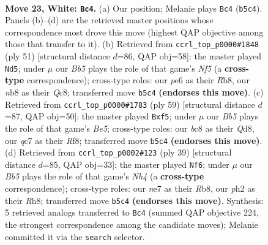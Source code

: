 \documentclass[11pt]{article}
\begin{document}
\clearpage

\begin{figure}[p]\centering
\begin{subfigure}{0.46\textwidth}\centering
\resizebox{\linewidth}{!}{%
\newchessgame
\chessboard[
  setfen={1nb2kr1/2q1n3/4p3/rBP1Pp2/p4N2/P3B3/2P2KPp/RQ5R w - - 1 23},
  showmover=false,
  pgfstyle=straightmove, color=movearrow, markmove={b5-c4}
]}
\caption{}
\end{subfigure}\hfill
\begin{subfigure}{0.46\textwidth}\centering
\resizebox{\linewidth}{!}{%
\newchessgame
\chessboard[
  setfen={1rq1r1k1/p4pp1/7p/2b5/P2N1n2/2P1p3/1P4PP/3RRQBK b - - 1 26},
  showmover=false,
  pgfstyle=straightmove, color=movearrow, markmove={f4-d5}
]}
\caption{}
\end{subfigure}
\\[4pt]
\begin{subfigure}{0.46\textwidth}\centering
\resizebox{\linewidth}{!}{%
\newchessgame
\chessboard[
  setfen={3q1rk1/r3b1p1/3p3p/p2P1P2/P1N1bB2/1P2R2P/3Q3K/5R2 b - - 0 30},
  showmover=false,
  pgfstyle=straightmove, color=movearrow, markmove={e4-f5}
]}
\caption{}
\end{subfigure}\hfill
\begin{subfigure}{0.46\textwidth}\centering
\resizebox{\linewidth}{!}{%
\newchessgame
\chessboard[
  setfen={1rq1k2r/pp2pp2/4b1p1/2P4n/3Q4/2N2B2/PP3P1P/3RK1R1 b k - 0 20},
  showmover=false,
  pgfstyle=straightmove, color=movearrow, markmove={h5-f6}
]}
\caption{}
\end{subfigure}
\caption{\textbf{Move 23, White: \texttt{Bc4}.} (a) Our position; Melanie plays \texttt{Bc4} (\texttt{b5c4}). Panels (b)--(d) are the retrieved master positions whose correspondence most drove this move (highest QAP objective among those that transfer to it). (b) Retrieved from \texttt{ccrl\_top\_p0000\#1848} (ply 51) [structural distance $d$=86, QAP obj=58]: the master played \texttt{Nd5}; under $\mu$ our \emph{Bb5} plays the role of that game's \emph{Nf5} (a \textbf{cross-type} correspondence); cross-type roles: our \emph{p}e6 as their \emph{R}b8, our \emph{n}b8 as their \emph{Q}c8; transferred move \texttt{b5c4} \textbf{(endorses this move)}. (c) Retrieved from \texttt{ccrl\_top\_p0000\#1783} (ply 59) [structural distance $d$=87, QAP obj=50]: the master played \texttt{Bxf5}; under $\mu$ our \emph{Bb5} plays the role of that game's \emph{Be5}; cross-type roles: our \emph{b}c8 as their \emph{Q}d8, our \emph{q}c7 as their \emph{R}f8; transferred move \texttt{b5c4} \textbf{(endorses this move)}. (d) Retrieved from \texttt{ccrl\_top\_p0002\#123} (ply 39) [structural distance $d$=85, QAP obj=33]: the master played \texttt{Nf6}; under $\mu$ our \emph{Bb5} plays the role of that game's \emph{Nh4} (a \textbf{cross-type} correspondence); cross-type roles: our \emph{n}e7 as their \emph{R}b8, our \emph{p}h2 as their \emph{R}h8; transferred move \texttt{b5c4} \textbf{(endorses this move)}. Synthesis: 5 retrieved analogs transferred to \texttt{Bc4} (summed QAP objective 224, the strongest correspondence among the candidate moves); Melanie committed it via the \texttt{search} selector.}
\label{fig:thought-m44}
\end{figure}
\end{document}
